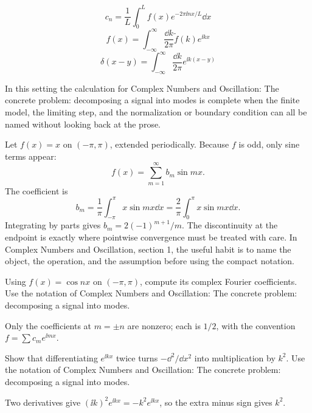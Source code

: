 \[
  c_n=\frac1L\int_0^L f(x)e^{-2\pi\ii nx/L}\dd x
\]
\[
  f(x)=\int_{-\infty}^{\infty}\frac{\dd k}{2\pi}\tilde f(k)e^{\ii kx}
\]
\[
  \delta(x-y)=\int_{-\infty}^{\infty}\frac{\dd k}{2\pi}e^{\ii k(x-y)}
\]

In this setting the calculation for Complex Numbers and Oscillation: The concrete problem: decomposing a signal into modes is complete when the finite model, the limiting step, and the normalization or boundary condition can all be named without looking back at the prose.




\begin{example}
Let \(f(x)=x\) on \((-\pi,\pi)\), extended periodically.  Because \(f\) is odd, only sine terms appear:
\[
  f(x)=\sum_{m=1}^\infty b_m\sin mx.
\]
The coefficient is
\[
  b_m=\frac1\pi\int_{-\pi}^\pi x\sin mx\dd x
  =\frac2\pi\int_0^\pi x\sin mx\dd x.
\]
Integrating by parts gives \(b_m=2(-1)^{m+1}/m\).  The discontinuity at the endpoint is exactly where pointwise convergence must be treated with care.  In Complex Numbers and Oscillation, section 1, the useful habit is to name the object, the operation, and the assumption before using the compact notation.
\end{example}



\begin{exercise}
Using \(f(x)=\cos nx\) on \((-\pi,\pi)\), compute its complex Fourier coefficients.  Use the notation of Complex Numbers and Oscillation: The concrete problem: decomposing a signal into modes.
\begin{answer}
Only the coefficients at \(m=\pm n\) are nonzero; each is \(1/2\), with the convention \(f=\sum c_me^{\ii mx}\).
\end{answer}
\end{exercise}

\begin{exercise}
Show that differentiating \(e^{\ii kx}\) twice turns \(-\dd^2/\dd x^2\) into multiplication by \(k^2\).  Use the notation of Complex Numbers and Oscillation: The concrete problem: decomposing a signal into modes.
\begin{answer}
Two derivatives give \((\ii k)^2e^{\ii kx}=-k^2e^{\ii kx}\), so the extra minus sign gives \(k^2\).
\end{answer}
\end{exercise}



